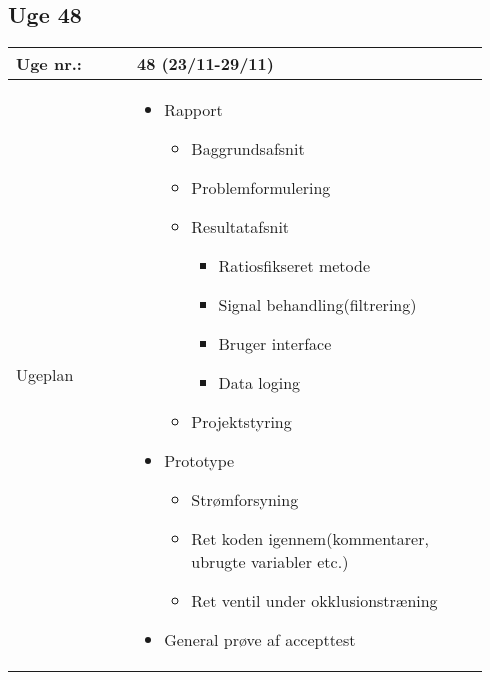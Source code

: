	\subsection{Uge 48} \label{app:logUge48}
	\begin{longtable}{|p{0.24\linewidth}|p{0.7\linewidth}|}
		\hline
		Uge nr.: & 48 (23/11-29/11)\\ \hline
		Ugeplan & 
		\begin{itemize}
			\item Rapport
			\begin{itemize}
				\item Baggrundsafsnit 
				\item Problemformulering
				\item Resultatafsnit
				\begin{itemize}
					\item Ratiosfikseret metode 
					\item Signal behandling(filtrering)
					\item Bruger interface
					\item Data loging 
				\end{itemize}
				\item Projektstyring
			\end{itemize}
			\item Prototype
			\begin{itemize}
				\item Strømforsyning
				\item Ret koden igennem(kommentarer, ubrugte variabler etc.) 
				\item Ret ventil under okklusionstræning
			\end{itemize}
			\item General prøve af accepttest
		\end{itemize}
		

\end{longtable}
